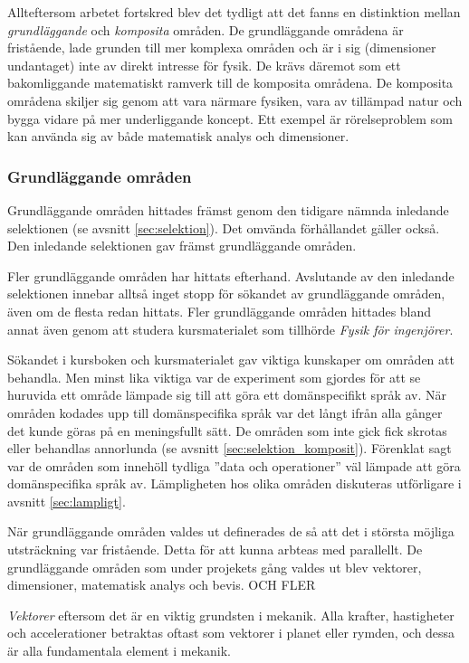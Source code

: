 \begin{binge}
Allteftersom arbetet fortskred blev det tydligt att det fanns en distinktion mellan \textit{grundläggande} och \textit{komposita} områden. De grundläggande områdena är fristående, lade grunden till mer komplexa områden och är i sig (dimensioner undantaget) inte av direkt intresse för fysik. De krävs däremot som ett bakomliggande matematiskt ramverk till de komposita områdena.  De komposita områdena skiljer sig genom att vara närmare fysiken, vara av tillämpad natur och bygga vidare på mer underliggande koncept. Ett exempel är rörelseproblem som kan använda sig av både matematisk analys och dimensioner.

\subsubsection{Grundläggande områden}

Grundläggande områden hittades främst genom den tidigare nämnda inledande selektionen (se avsnitt \ref{sec:selektion}). Det omvända förhållandet gäller också. Den inledande selektionen gav främst grundläggande områden.

Fler grundläggande områden har hittats efterhand. Avslutande av den inledande selektionen innebar alltså inget stopp för sökandet av grundläggande områden, även om de flesta redan hittats. Fler grundläggande områden hittades bland annat även genom att studera kursmaterialet som tillhörde \textit{Fysik för ingenjörer}.

Sökandet i kursboken och kursmaterialet gav viktiga kunskaper om områden att behandla. Men minst lika viktiga var de experiment som gjordes för att se huruvida ett område lämpade sig till att göra ett domänspecifikt språk av. När områden kodades upp till domänspecifika språk var det långt ifrån alla gånger det kunde göras på en meningsfullt sätt. De områden som inte gick fick skrotas eller behandlas annorlunda (se avsnitt \ref{sec:selektion_komposit}). Förenklat sagt var de områden som innehöll tydliga ''data och operationer'' väl lämpade att göra domänspecifika språk av. Lämpligheten hos olika områden diskuteras utförligare i avsnitt \ref{sec:lampligt}.

När grundläggande områden valdes ut definerades de så att det i största möjliga utsträckning var fristående. Detta för att kunna arbteas med parallellt. De grundläggande områden som under projekets gång valdes ut blev vektorer, dimensioner, matematisk analys och bevis. OCH FLER

\textit{Vektorer} eftersom det är en viktig grundsten i mekanik. Alla krafter, hastigheter och accelerationer betraktas oftast som vektorer i planet eller rymden, och dessa är alla fundamentala element i mekanik.


\end{binge}
